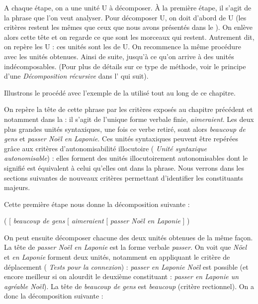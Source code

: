 A chaque étape, on a une unité U à décomposer. À la première étape, il s’agit de la phrase que l’on veut analyser. Pour décomposer U, on doit d’abord  de U (les critères restent les mêmes que ceux que nous avons présentés dans le ). On enlève alors cette tête et on regarde ce que sont les morceaux qui restent. Autrement dit, on repère les   U : ces unités sont les  de U. On recommence la même procédure avec les unités obtenues. Ainsi de suite, jusqu’à ce qu’on arrive à des unités indécomposables. (Pour plus de détails sur ce type de méthode, voir le principe d’une \textit{Décomposition récursive} dans l’ qui suit).

Illustrons le procédé avec l’exemple  de la  utilisé tout au long de ce chapitre.

On repère la tête de cette phrase par les critères exposés au chapitre précédent et notamment dans la  : il s’agit de l’unique forme verbale finie, \textit{aimeraient}. Les deux plus grandes unités syntaxiques, une fois ce verbe retiré, sont alors \textit{beaucoup de gens} et \textit{passer Noël en Laponie}. Ces unités syntaxiques peuvent être repérées grâce aux critères d’autonomisabilité illocutoire ( \textit{Unité syntaxique autonomisable}) : elles forment des unités illocutoirement autonomisables dont le signifié est équivalent à celui qu’elles ont dans la phrase. Nous verrons dans les sections suivantes de nouveaux critères permettant d’identifier les constituants majeurs.

Cette première étape nous donne la décomposition suivante :

\ea
   ( [ \textit{beaucoup de gens} [ \textit{aimeraient} [ \textit{passer Noël en Laponie} ] )
\z

On peut ensuite décomposer chacune des deux unités obtenues de la même façon. La tête de \textit{passer Noël en Laponie} est la forme verbale \textit{passer}. On voit que \textit{Nöel} et \textit{en Laponie} forment deux unités, notamment en appliquant le critère de déplacement ( \textit{Tests pour la connexion}) : \textit{passer en Laponie Noël} est possible (et encore meilleur si on alourdit le deuxième constituant : \textit{passer en Laponie un agréable Noël}). La tête de \textit{beaucoup de gens} est \textit{beaucoup} (critère rectionnel). On a donc la décomposition suivante :

